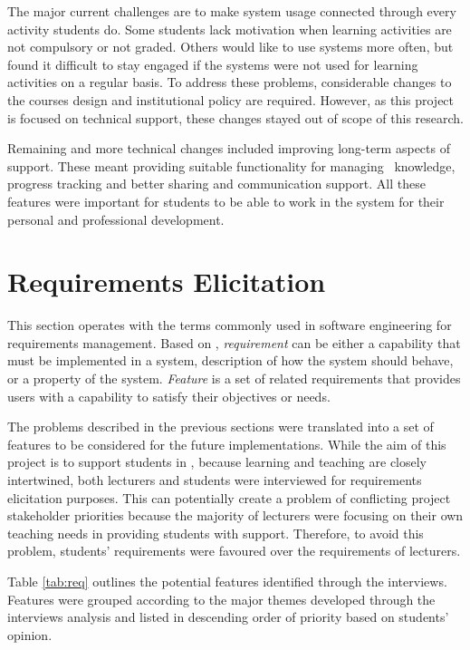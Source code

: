 The major current challenges are to make system usage
connected through every activity students do. Some students lack motivation
when learning activities are not compulsory or not graded. Others would like to
use systems more often, but found it difficult to stay engaged if the systems
were not used for learning activities on a regular basis. To address these
problems, considerable changes to the courses design and institutional policy
are required. However, as this project is focused on technical support, these
changes stayed out of scope of this research.

Remaining and more technical changes included improving long-term aspects of
\LLLs support. These meant providing suitable functionality for managing
\ep~knowledge, progress tracking and better sharing and communication support.
All these features were important for students to be able to work in the system
for their personal and professional development. 

\section{Requirements Elicitation}
\label{sec:elicit}
This section operates with the terms commonly used in software engineering for
requirements management. Based on \citet{Wiegers2003}, \textit{requirement} can
be either a capability that must be implemented in a system, description of how
the system should behave, or a property of the system. \textit{Feature} is a set
of related requirements that provides users with a capability to satisfy their
objectives or needs.

The problems described in the previous sections were translated into a set of
features to be considered for the future implementations. While the aim of this
project is to support students in \LLLsn, because learning and teaching are
closely intertwined, both lecturers and students were interviewed for
requirements elicitation purposes. This can potentially create a problem of
conflicting project stakeholder priorities \citep{Leffingwell2011} because the
majority of lecturers were focusing on their own teaching needs in providing
students with \LLLs support. Therefore, to avoid this problem, students'
requirements were favoured over the requirements of lecturers. 

Table \ref{tab:req} outlines the potential features identified through the
interviews. Features were grouped according to the major themes developed
through the interviews analysis and listed in descending order of priority based
on students' opinion.

